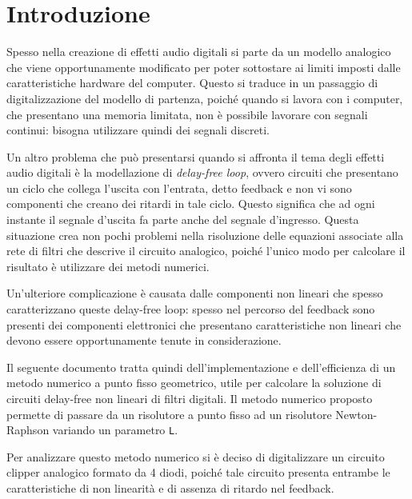 \documentclass[12pt,a4paper,twoside,english,italian]{book}
\begin{document}
	\pagestyle{fancy} 
	\frontmatter
	\maketitle	

	\enlargethispage{-1.5\baselineskip}
	\tableofcontents
	
	\chapter*{Introduzione}
		Spesso nella creazione di effetti audio digitali si parte da un modello analogico che viene opportunamente modificato per poter sottostare ai limiti imposti dalle caratteristiche hardware del computer. Questo si traduce in un passaggio di digitalizzazione del modello di partenza, poiché quando si lavora con i computer, che presentano una memoria limitata, non è possibile lavorare con segnali continui: bisogna utilizzare quindi dei segnali discreti.
		
		Un altro problema che può presentarsi quando si affronta il tema degli effetti audio digitali è la modellazione di \textit{delay-free loop}, ovvero circuiti che presentano un ciclo che collega l'uscita con l'entrata, detto feedback e non vi sono componenti che creano dei ritardi in tale ciclo. Questo significa che ad ogni instante il segnale d'uscita fa parte anche del segnale d'ingresso. Questa situazione crea non pochi problemi nella risoluzione delle equazioni associate alla rete di filtri che descrive il circuito analogico, poiché l'unico modo per calcolare il risultato è utilizzare dei metodi numerici.
		
		Un'ulteriore complicazione è causata dalle componenti non lineari che spesso caratterizzano queste delay-free loop: spesso nel percorso del feedback sono presenti dei componenti elettronici che presentano caratteristiche non lineari che devono essere opportunamente tenute in considerazione.
			
		Il seguente documento tratta quindi dell'implementazione e dell'efficienza di un metodo numerico a punto fisso geometrico, utile per calcolare la soluzione di circuiti delay-free non lineari di filtri digitali. Il metodo numerico proposto permette di passare da un risolutore a punto fisso ad un risolutore Newton-Raphson variando un parametro \texttt{L}.
		
		Per analizzare questo metodo numerico si è deciso di digitalizzare un circuito clipper analogico formato da 4 diodi, poiché tale circuito presenta entrambe le caratteristiche di non linearità e di assenza di ritardo nel feedback.
		
\end{document}
